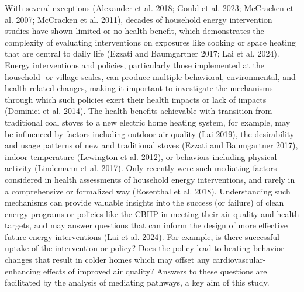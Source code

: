 \documentclass[
  letterpaper,
  DIV=11,
  numbers=noendperiod]{scrartcl}
\providecommand{\DIFaddtex}[1]{{\protect\color{blue}\uwave{#1}}} %
\providecommand{\DIFaddbegin}{} %
\providecommand{\DIFaddend}{} %
\providecommand{\DIFdelbegin}{} %
\providecommand{\DIFdelend}{} %
\providecommand{\DIFadd}[1]{\texorpdfstring{\DIFaddtex{#1}}{#1}} %
\newcommand{\DIFscaledelfig}{0.5}
\newlength{\DIFdelgraphicswidth} %
\newlength{\DIFdelgraphicsheight} %
\newcommand{\DIFaddincludegraphics}[2][]{{\color{blue}\fbox{\DIFOincludegraphics[#1]{#2}}}} %
\newcommand{\DIFdelincludegraphics}[2][]{%
\sbox{\DIFdelgraphicsbox}{\DIFOincludegraphics[#1]{#2}}%
\settoboxwidth{\DIFdelgraphicswidth}{\DIFdelgraphicsbox} %
\settoboxtotalheight{\DIFdelgraphicsheight}{\DIFdelgraphicsbox} %
\scalebox{\DIFscaledelfig}{%
\parbox[b]{\DIFdelgraphicswidth}{\usebox{\DIFdelgraphicsbox}\\[-\baselineskip] \rule{\DIFdelgraphicswidth}{0em}}\llap{\resizebox{\DIFdelgraphicswidth}{\DIFdelgraphicsheight}{%
\setlength{\unitlength}{\DIFdelgraphicswidth}%
\begin{picture}(1,1)%
\thicklines\linethickness{2pt} %
{\color[rgb]{1,0,0}\put(0,0){\framebox(1,1){}}}%
{\color[rgb]{1,0,0}\put(0,0){\line( 1,1){1}}}%
{\color[rgb]{1,0,0}\put(0,1){\line(1,-1){1}}}%
\end{picture}%
}\hspace*{3pt}}} %
} %
\DeclareRobustCommand{\DIFaddbegin}{\DIFOaddbegin \let\includegraphics\DIFaddincludegraphics} %
\DeclareRobustCommand{\DIFaddend}{\DIFOaddend \let\includegraphics\DIFOincludegraphics} %
\DeclareRobustCommand{\DIFdelbegin}{\DIFOdelbegin \let\includegraphics\DIFdelincludegraphics} %
\DeclareRobustCommand{\DIFdelend}{\DIFOaddend \let\includegraphics\DIFOincludegraphics} %
\begin{document}
With several exceptions (Alexander et al. 2018; Gould et al. 2023;
McCracken et al. 2007; McCracken et al. 2011), decades of household
energy intervention studies have shown limited or no health benefit,
which demonstrates the complexity of evaluating interventions on
exposures like cooking or space heating that are central to daily life
(Ezzati and Baumgartner 2017; Lai et al. 2024). Energy interventions and
policies, particularly those implemented at the household- or
village-scales, can produce multiple behavioral, environmental, and
health-related changes, making it important to investigate the
mechanisms through which such policies exert their health impacts or
lack of impacts (Dominici et al. 2014). The health benefits achievable
with transition from traditional coal stoves to a new electric home
heating system, for example, may be influenced by factors including
outdoor air quality (Lai 2019), the desirability and usage patterns of
new and traditional stoves (Ezzati and Baumgartner 2017), indoor
temperature (Lewington et al. 2012), or behaviors including physical
activity (Lindemann et al. 2017). Only recently were such mediating
factors considered in health assessments of household energy
interventions, and rarely in a comprehensive or formalized way
(Rosenthal et al. 2018). Understanding such mechanisms can provide
valuable insights into the success (or failure) of clean energy programs
or policies like the CBHP in meeting their air quality and health
targets, and may answer questions that can inform the design of more
effective future energy interventions (Lai et al. 2024). For example, is
there successful uptake of the intervention or policy? Does the policy
lead to heating behavior changes that result in colder homes which may
offset any cardiovascular-enhancing effects of improved air quality?
Answers to these questions are facilitated by the analysis of mediating
pathways, a key aim of this study.

\DIFdelbegin %
\DIFdelend \DIFaddbegin \section{\DIFadd{Specific Aims and Overarching
Approach}}\label{specific-aims-and-overarching-approach}
\DIFaddend 
\end{document}
